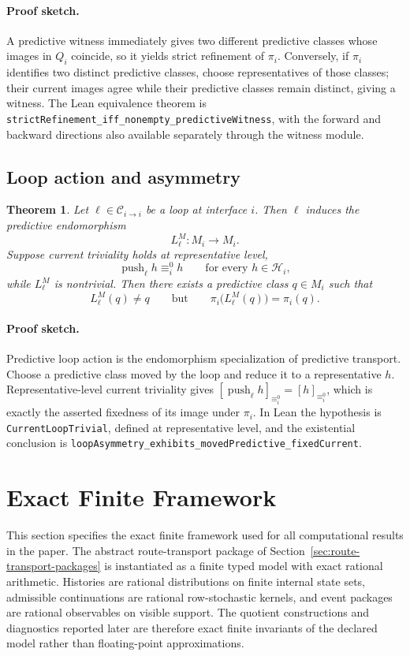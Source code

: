 \documentclass[11pt]{article}
\newcommand{\CurrentQ}{Q}
\newcommand{\PredictiveQ}{M}
\newcommand{\Histories}{\mathcal{H}}
\newcommand{\CurrentEquiv}{\equiv^{0}}
\newtheorem{theorem}{Theorem}[section]
\theoremstyle{definition}
\begin{document}
\paragraph{Proof sketch.}
A predictive witness immediately gives two different predictive classes whose images in $\CurrentQ_i$ coincide, so it yields strict refinement of $\pi_i$. Conversely, if $\pi_i$ identifies two distinct predictive classes, choose representatives of those classes; their current images agree while their predictive classes remain distinct, giving a witness. The Lean equivalence theorem is \texttt{strictRefinement\_iff\_nonempty\_predictiveWitness}, with the forward and backward directions also available separately through the witness module.

\subsection{Loop action and asymmetry}\label{subsec:thm-loops}
\begin{theorem}\label{thm:loop-asymmetry}
Let $\ell\in\mathcal{C}_{i\to i}$ be a loop at interface $i$. Then $\ell$ induces the predictive endomorphism
\[
L^{\PredictiveQ}_{\ell} : \PredictiveQ_i \to \PredictiveQ_i.
\]
Suppose current triviality holds at representative level,
\[
\operatorname{push}_{\ell}h \CurrentEquiv_i h
\qquad\text{for every }h\in\Histories_i,
\]
while $L^{\PredictiveQ}_{\ell}$ is nontrivial. Then there exists a predictive class $q\in\PredictiveQ_i$ such that
\[
L^{\PredictiveQ}_{\ell}(q)\neq q
\qquad\text{but}\qquad
\pi_i\bigl(L^{\PredictiveQ}_{\ell}(q)\bigr)=\pi_i(q).
\]
\end{theorem}

\paragraph{Proof sketch.}
Predictive loop action is the endomorphism specialization of predictive transport. Choose a predictive class moved by the loop and reduce it to a representative $h$. Representative-level current triviality gives $[\operatorname{push}_{\ell}h]_{\CurrentEquiv_i}=[h]_{\CurrentEquiv_i}$, which is exactly the asserted fixedness of its image under $\pi_i$. In Lean the hypothesis is \texttt{CurrentLoopTrivial}, defined at representative level, and the existential conclusion is \texttt{loopAsymmetry\_exhibits\_movedPredictive\_fixedCurrent}.

\section{Exact Finite Framework}\label{sec:exact-finite-framework}
This section specifies the exact finite framework used for all computational results in the paper. The abstract route-transport package of Section~\ref{sec:route-transport-packages} is instantiated as a finite typed model with exact rational arithmetic. Histories are rational distributions on finite internal state sets, admissible continuations are rational row-stochastic kernels, and event packages are rational observables on visible support. The quotient constructions and diagnostics reported later are therefore exact finite invariants of the declared model rather than floating-point approximations.
\end{document}

